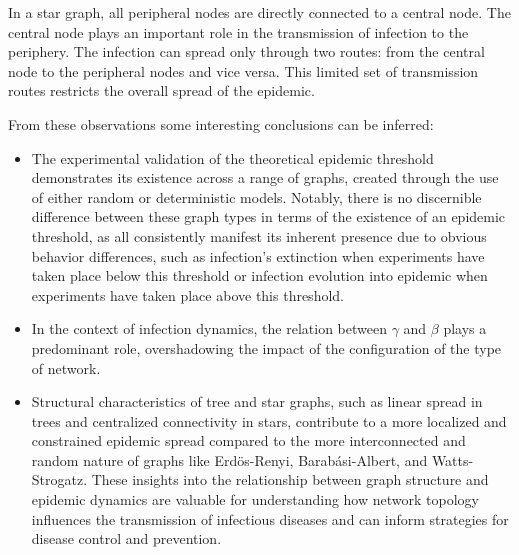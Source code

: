 In a star graph, all peripheral nodes are directly connected to a central node. The central node plays an important role in the transmission of infection to the periphery. The infection can spread only through two routes: from the central node to the peripheral nodes and vice versa. This limited set of transmission routes restricts the overall spread of the epidemic.

From these observations some interesting conclusions can be inferred:
\begin{itemize}
\item The experimental validation of the theoretical epidemic threshold demonstrates its existence across a range of graphs, created through the use of either random  or deterministic models. Notably, there is no discernible difference between these graph types in terms of the existence of an epidemic threshold, as all consistently manifest its inherent presence due to obvious behavior differences, such as infection's extinction when experiments have taken place below this threshold or infection evolution into epidemic when experiments have taken place above this threshold.
\item In the context of infection dynamics, the relation between $\gamma$ and $\beta$ plays a predominant role, overshadowing the impact of the configuration of the type of network.
\item Structural characteristics of tree and star graphs, such as linear spread in trees and centralized connectivity in stars, contribute to a more localized and constrained epidemic spread compared to the more interconnected and random nature of graphs like Erdös-Renyi, Barabási-Albert, and Watts-Strogatz. These insights into the relationship between graph structure and epidemic dynamics are valuable for understanding how network topology influences the transmission of infectious diseases and can inform strategies for disease control and prevention.

\end{itemize}